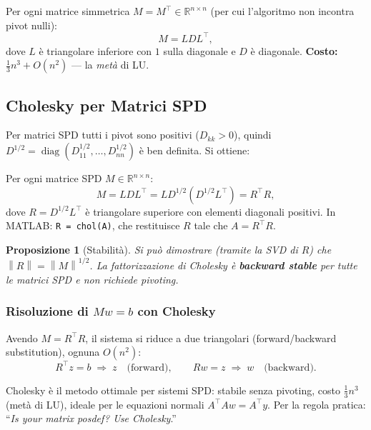 \documentclass[11pt,a4paper]{article}
\theoremstyle{definition}
\theoremstyle{plain}
\newtheorem{proposition}{Proposizione}[section]
\theoremstyle{remark}
\newcommand{\R}{\mathbb{R}}
\newcommand{\norm}[1]{\left\| #1 \right\|}
\newcommand{\T}{^{\top}}
\begin{document}
\begin{keybox}[Fattorizzazione $LDL\T$]
  Per ogni matrice simmetrica $M = M\T \in \R^{n \times n}$ (per cui l'algoritmo non incontra pivot nulli):
  \[
    M = L D L\T,
  \]
  dove $L$ è triangolare inferiore con $1$ sulla diagonale e $D$ è diagonale.
  \textbf{Costo:} $\frac{1}{3}n^3 + O(n^2)$ --- la \emph{metà} di LU.
\end{keybox}

\subsection{Cholesky per Matrici SPD}

Per matrici SPD tutti i pivot sono positivi ($D_{kk} > 0$), quindi $D^{1/2} = \operatorname{diag}(D_{11}^{1/2}, \ldots, D_{nn}^{1/2})$
è ben definita. Si ottiene:

\begin{keybox}
  Per ogni matrice SPD $M \in \R^{n \times n}$:
  \[
    M = L D L\T = L D^{1/2}(D^{1/2} L\T) = R\T R,
  \]
  dove $R = D^{1/2} L\T$ è triangolare superiore con elementi diagonali positivi.
  In MATLAB: \texttt{R = chol(A)}, che restituisce $R$ tale che $A = R\T R$.
\end{keybox}

\begin{proposition}[Stabilità]
  Si può dimostrare (tramite la SVD di $R$) che $\norm{R} = \norm{M}^{1/2}$.
  La fattorizzazione di Cholesky è \textbf{backward stable} per tutte le matrici SPD
  e non richiede pivoting.
\end{proposition}

\subsubsection*{Risoluzione di $Mw = b$ con Cholesky}

Avendo $M = R\T R$, il sistema si riduce a due triangolari (forward/backward substitution), ognuna $O(n^2)$:
\[
  R\T z = b \;\Rightarrow\; z \quad\text{(forward)}, \qquad Rw = z \;\Rightarrow\; w \quad\text{(backward)}.
\]

\begin{intubox}
  Cholesky è il metodo ottimale per sistemi SPD: stabile senza pivoting, costo $\frac{1}{3}n^3$
  (metà di LU), ideale per le equazioni normali $A\T Aw = A\T y$.
  Per la regola pratica: ``\emph{Is your matrix posdef? Use Cholesky}.''
\end{intubox}
\end{document}
